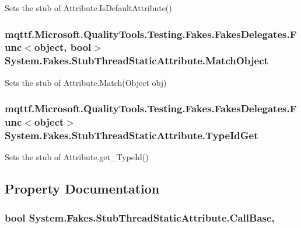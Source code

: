 Sets the stub of Attribute.\-Is\-Default\-Attribute()

\hypertarget{class_system_1_1_fakes_1_1_stub_thread_static_attribute_ae116a155a4687d1baec477f42effa2cf}{
\subsubsection[{Match\-Object}]{\setlength{\rightskip}{0pt plus 5cm}mqttf.\-Microsoft.\-Quality\-Tools.\-Testing.\-Fakes.\-Fakes\-Delegates.\-Func$<$object, bool$>$ System.\-Fakes.\-Stub\-Thread\-Static\-Attribute.\-Match\-Object}}\label{class_system_1_1_fakes_1_1_stub_thread_static_attribute_ae116a155a4687d1baec477f42effa2cf}


Sets the stub of Attribute.\-Match(\-Object obj)

\hypertarget{class_system_1_1_fakes_1_1_stub_thread_static_attribute_a72bc5464591131a7fc47bfec1225eeab}{
\subsubsection[{Type\-Id\-Get}]{\setlength{\rightskip}{0pt plus 5cm}mqttf.\-Microsoft.\-Quality\-Tools.\-Testing.\-Fakes.\-Fakes\-Delegates.\-Func$<$object$>$ System.\-Fakes.\-Stub\-Thread\-Static\-Attribute.\-Type\-Id\-Get}}\label{class_system_1_1_fakes_1_1_stub_thread_static_attribute_a72bc5464591131a7fc47bfec1225eeab}


Sets the stub of Attribute.\-get\-\_\-\-Type\-Id()



\subsection{Property Documentation}
\hypertarget{class_system_1_1_fakes_1_1_stub_thread_static_attribute_ac39c0b5412489ecaebef531bc7dcd66a}{
\subsubsection[{Call\-Base}]{\setlength{\rightskip}{0pt plus 5cm}bool System.\-Fakes.\-Stub\-Thread\-Static\-Attribute.\-Call\-Base\hspace{0.3cm}{\ttfamily [get]}, {\ttfamily [set]}}}\label{class_system_1_1_fakes_1_1_stub_thread_static_attribute_ac39c0b5412489ecaebef531bc7dcd66a}


